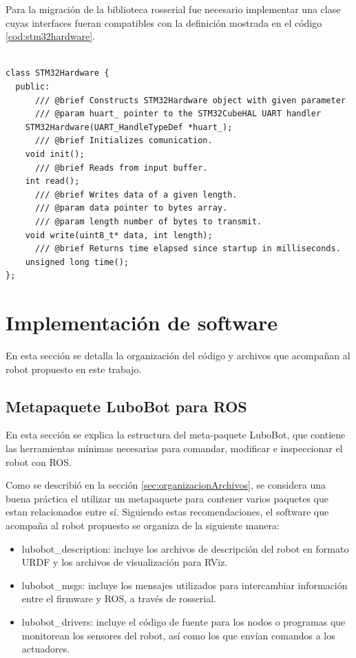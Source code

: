 Para la migración de la biblioteca rosserial fue necesario implementar una clase cuyas interfaces fueran compatibles con la definición mostrada en el código \ref{cod:stm32hardware}.

\begin{lstlisting}[label=cod:stm32hardware, caption=Interfaz de la clase STM32Hardware requerida por la biblioteca rosserial\protect\footnotemark.]

class STM32Hardware {
  public:
	  /// @brief Constructs STM32Hardware object with given parameter
	  /// @param huart_ pointer to the STM32CubeHAL UART handler
    STM32Hardware(UART_HandleTypeDef *huart_);
	  /// @brief Initializes comunication.
    void init();
	  /// @brief Reads from input buffer.
    int read();
	  /// @brief Writes data of a given length.
	  /// @param data pointer to bytes array.
	  /// @param length number of bytes to transmit.
    void write(uint8_t* data, int length);
	  /// @brief Returns time elapsed since startup in milliseconds.
    unsigned long time();
};

\end{lstlisting}


\section{Implementación de software}

En esta sección se detalla la organización del código y archivos que acompañan al robot propuesto en este trabajo.

\subsection{Metapaquete LuboBot para ROS}

En esta sección se explica la estructura del meta-paquete LuboBot, que contiene las herramientas mínimas necesarias para comandar, modificar e inspeccionar el robot con ROS.

Como se describió en la sección \ref{sec:organizacionArchivos}, se considera una buena práctica el utilizar un metapaquete para contener varios paquetes que estan relacionados entre sí. Siguiendo estas recomendaciones, el software que acompaña al robot propuesto se organiza de la siguiente manera:

\begin{itemize}
  \item lubobot\_description: incluye los archivos de descripción del robot en formato URDF y los archivos de visualización para RViz.
  \item lubobot\_msgs: incluye los mensajes utilizados para intercambiar información entre el firmware y ROS, a través de rosserial.
  \item lubobot\_drivers: incluye el código de fuente para los nodos o programas que monitorean los sensores del robot, así como los que envían comandos a los actuadores.
\end{itemize}

